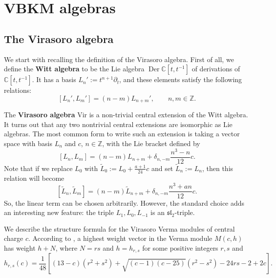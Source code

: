\documentclass[11pt]{amsart}
\newcommand{\mc}{\mathcal}
\newcommand{\C}{\mathbb{C}}
\newcommand{\Z}{\mathbb{Z}}
\newcommand{\g}{\mathfrak{g}}
\newcommand{\Vir}{\mathrm{Vir}}
\renewcommand{\sl}{\mathfrak{sl}}
\numberwithin{equation}{section}
\theoremstyle{plain}
\theoremstyle{definition}
\begin{document}

\section{VBKM algebras}\label{s:VBKM_algebras}
\subsection{The Virasoro algebra}
We start with recalling the definition of the Virasoro algebra. First of all, we define the {\bfseries Witt algebra} to be the Lie algebra $\operatorname{Der}\C[t,t^{-1}]$ of derivations of $\C[t,t^{-1}]$. It has a basis $L_n':=t^{n+1}\partial_t$, and these elements satisfy the following relations:
$$
[L_n',L_m']=(n-m)L_{n+m}',\qquad n,m\in\Z.
$$

The {\bfseries Virasoro algebra} $\Vir$ is a non-trivial central extension of the Witt algebra. It turns out that any two nontrivial central extensions are isomorphic as Lie algebras. The most common form to write such an extension is taking a vector space with basis $L_n$ and $c$, $n\in\Z$, with the Lie bracket defined by
$$
[L_n,L_m]=(n-m)L_{n+m}+\delta_{n,-m}\frac{n^3-n}{12}c.
$$
Note that if we replace $L_0$ with $\tilde L_0:=L_0+\frac {a+1}{24}c$ and set $\tilde L_n:=L_n$, then this relation will become
$$
[\tilde L_n,\tilde L_m]=(n-m)\tilde L_{n+m}+\delta_{n,-m}\frac{n^3+an}{12}c.
$$
So, the linear term can be chosen arbitrarily. However, the standard choice adds an interesting new feature: the triple $L_{1},L_0,L_{-1}$ is an $\sl_2$-triple.


We describe the structure formula for the Virasoro Verma modules of central charge $c$. According to \cite[Theorem 8.1]{KR97}, a highest weight vector in the Verma module $M(c,h)$ has weight $h+N$, where $N=rs$ and $h=h_{r,s}$ for some positive integers $r,s$ and
\begin{equation}\label{eq:Virasoro_highest_weights}
    h_{r,s}(c) = \frac{1}{48} \left[ (13 - c)(r^2 + s^2) + \sqrt{(c-1)(c-25)} (r^2 - s^2) - 24rs - 2 + 2c \right].
\end{equation}

\end{document}
